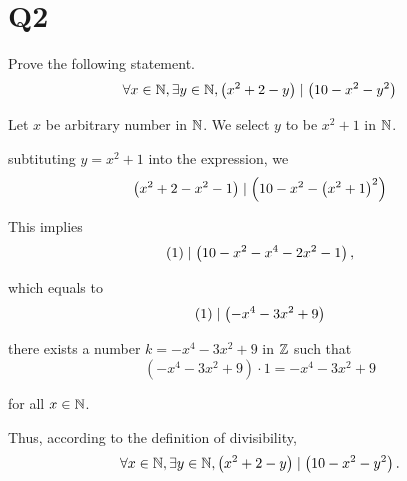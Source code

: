 \section{Q2}
Prove the following statement. 
\begin{equation*}
    \forall x \in \mathbb{N}, \exists y \in \mathbb{N}, \left(x^2 + 2 - y\right) \mid \left(10 - x^2 - y^2\right)
\end{equation*}
\begin{solution}
    Let $x$ be arbitrary number in $\mathbb{N}$. We select $y$ to be $x^2 + 1$ in $\mathbb{N}$. 

    subtituting $y = x^2 + 1$ into the expression, we 
    \begin{equation*}
        \left(x^2 + 2 - x^2 - 1\right) \mid \left(10 - x^2 - \left(x^2 + 1\right)^2\right)
    \end{equation*}

    This implies 
    \begin{equation*}
        \left(1\right) \mid \left(10 - x^2 - x^4 - 2x^2 - 1 \right), 
    \end{equation*}

    which equals to 
    \begin{equation*}
        \left(1\right) \mid \left(-x^4 - 3x^2 + 9\right)
    \end{equation*}

    there exists a number $k = -x^4 - 3x^2 + 9$ in $\mathbb{Z}$ such that 
    \begin{equation*}
        (-x^4 - 3x^2 + 9) \cdot 1 =  -x^4 - 3x^2 + 9
    \end{equation*}

    for all $x \in \mathbb{N}$. 

    Thus, according to the definition of divisibility, 
    \begin{equation*}
        \forall x \in \mathbb{N}, \exists y \in \mathbb{N}, \left(x^2 + 2 - y\right) \mid \left(10 - x^2 - y^2\right). 
    \end{equation*}
\end{solution}